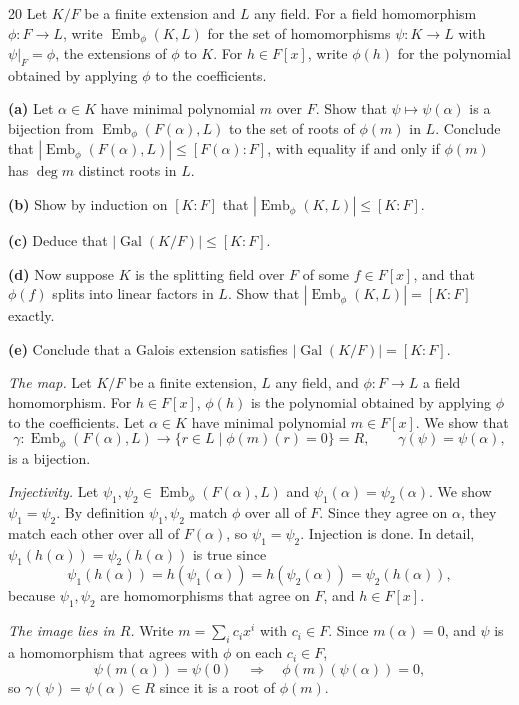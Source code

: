 \documentclass[11pt]{article}
\begin{document}
\begin{problem}{20}
Let $K/F$ be a finite extension and $L$ any field. For a field homomorphism $\phi\colon F\to L$, write $\operatorname{Emb}_\phi(K,L)$ for the set of homomorphisms $\psi\colon K\to L$ with $\psi|_F=\phi$, the extensions of $\phi$ to $K$. For $h\in F[x]$, write $\phi(h)$ for the polynomial obtained by applying $\phi$ to the coefficients.

\textbf{(a)} Let $\alpha\in K$ have minimal polynomial $m$ over $F$. Show that $\psi\mapsto\psi(\alpha)$ is a bijection from $\operatorname{Emb}_\phi(F(\alpha),L)$ to the set of roots of $\phi(m)$ in $L$. Conclude that $|\operatorname{Emb}_\phi(F(\alpha),L)|\le[F(\alpha):F]$, with equality if and only if $\phi(m)$ has $\deg m$ distinct roots in $L$.

\textbf{(b)} Show by induction on $[K:F]$ that $|\operatorname{Emb}_\phi(K,L)|\le[K:F]$.

\textbf{(c)} Deduce that $|\operatorname{Gal}(K/F)|\le[K:F]$.

\textbf{(d)} Now suppose $K$ is the splitting field over $F$ of some $f\in F[x]$, and that $\phi(f)$ splits into linear factors in $L$. Show that $|\operatorname{Emb}_\phi(K,L)|=[K:F]$ exactly.

\textbf{(e)} Conclude that a Galois extension satisfies $|\operatorname{Gal}(K/F)|=[K:F]$.
\end{problem}
\emph{The map.} Let $K/F$ be a finite extension, $L$ any field, and $\phi\colon F\to L$ a field homomorphism. For $h\in F[x]$, $\phi(h)$ is the polynomial obtained by applying $\phi$ to the coefficients. Let $\alpha\in K$ have minimal polynomial $m\in F[x]$. We show that
\[
\gamma\colon\operatorname{Emb}_\phi(F(\alpha),L)\longrightarrow\{r\in L\mid\phi(m)(r)=0\}=R,\qquad \gamma(\psi)=\psi(\alpha),
\]
is a bijection.

\emph{Injectivity.} Let $\psi_1,\psi_2\in\operatorname{Emb}_\phi(F(\alpha),L)$ and $\psi_1(\alpha)=\psi_2(\alpha)$. We show $\psi_1=\psi_2$. By definition $\psi_1,\psi_2$ match $\phi$ over all of $F$. Since they agree on $\alpha$, they match each other over all of $F(\alpha)$, so $\psi_1=\psi_2$. Injection is done. In detail, $\psi_1(h(\alpha))=\psi_2(h(\alpha))$ is true since
\[
\psi_1(h(\alpha))=h(\psi_1(\alpha))=h(\psi_2(\alpha))=\psi_2(h(\alpha)),
\]
because $\psi_1,\psi_2$ are homomorphisms that agree on $F$, and $h\in F[x]$.

\emph{The image lies in $R$.} Write $m=\sum_i c_i x^i$ with $c_i\in F$. Since $m(\alpha)=0$, and $\psi$ is a homomorphism that agrees with $\phi$ on each $c_i\in F$,
\[
\psi(m(\alpha))=\psi(0)\quad\Longrightarrow\quad\phi(m)(\psi(\alpha))=0,
\]
so $\gamma(\psi)=\psi(\alpha)\in R$ since it is a root of $\phi(m)$.
\end{document}

